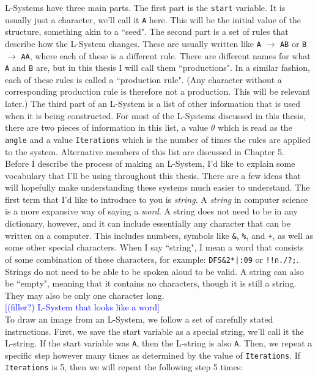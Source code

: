 \documentclass[12pt,twoside]{reedthesis}
\newcommand{\code}[1]{\texttt{#1}}
\begin{document}
	L-Systems have three main parts. The first part is the \code{start} variable. It is usually just a character, we'll call it \code{A} here. This will be the initial value of the structure, something akin to a ``seed". The second part is a set of rules that describe how the L-System changes. These are usually written like \code{A} $\rightarrow$ \code{AB} or \code{B} $\rightarrow$ \code{AA}, where each of these is a different rule. There are different names for what \code{A} and \code{B} are, but in this thesis I will call them ``productions". In a similar fashion, each of these rules is called a ``production rule". (Any character without a corresponding production rule is therefore not a production. This will be relevant later.) The third part of an L-System is a list of other information that is used when it is being constructed. For most of the L-Systems discussed in this thesis, there are two pieces of information in this list, a value $\theta$ which is read as the \code{angle} and a value \code{Iterations} which is the number of times the rules are applied to the system. Alternative members of this list are discussed in Chapter 5.\\

	Before I describe the process of making an L-System, I'd like to explain some vocabulary that I'll be using throughout this thesis. There are a few ideas that will hopefully make understanding these systems much easier to understand. The first term that I'd like to introduce to you is \textit{string}. A \textit{string} in computer science is a more expansive way of saying a \textit{word}. A string does not need to be in any dictionary, however, and it can include essentially any character that can be written on a computer. This includes numbers, symbols like \code{\&}, \code{\%}, and \code{+}, as well as some other special characters. When I say ``string", I mean a word that consists of some combination of these characters, for example: \code{DFS\&2*|:09} or \code{!!n./?;}. Strings do not need to be able to be spoken aloud to be valid. A string can also be ``empty", meaning that it contains no characters, though it is still a string. They may also be only one character long. \\
	
	\textcolor{blue}{[(filler?) L-System that looks like a word]}\\
	
	To draw an image from an L-System, we follow a set of carefully stated instructions. First, we save the start variable as a special string, we'll call it the L-string. If the start variable was \code{A}, then the L-string is also \code{A}. Then, we repeat a specific step however many times as determined by the value of \code{Iterations}. If \code{Iterations} is 5, then we will repeat the following step 5 times:\\
	
\end{document}
